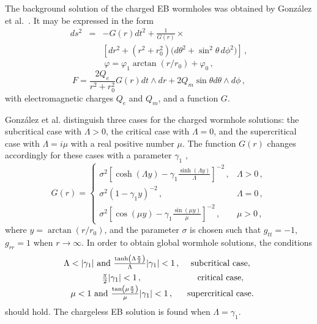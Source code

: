 \documentclass[floats,floatfix,showpacs,amssymb,prd,superscriptaddress,nofootinbib,nolongbibliography,reprint]{revtex4-2}
\begin{document}
The background solution of the charged EB wormholes was obtained by Gonz\'alez et al.~\cite{Gonzalez:2009hn}.
It may be expressed in the form
\begin{eqnarray}
     ds^2 &=&  -G(r) dt^2 
     +{\frac{1}{G(r)}} \times 
     \nonumber \\ &&
    \left[dr^2+(r^2+r_0^2) 
 {   (d\theta^2+ \sin^2{\theta}  \,
    d\phi^2 }
    ) \right] \,,
    \label{eqm}
\end{eqnarray}
\begin{equation}
    \varphi=\varphi_1\arctan{(r/r_0)}+\varphi_0 \, ,
    \label{eqa}
\end{equation}
\begin{equation}
    F=\frac{2Q_e}{r^2+r_0^2}G(r)  dt\wedge dr+2Q_m\sin{\theta}d\theta\wedge d\phi \, ,
    \label{eqp}
\end{equation}
with electromagnetic charges $Q_e$ and $Q_m$, 
and a function $G$.


Gonz\'alez et al.
distinguish three cases for the charged wormhole solutions:
the subcritical case with $\Lambda>0$, the critical case with $\Lambda=0$, and the supercritical case with $\Lambda=i\mu$ with a real positive number $\mu$.
The function $G(r)$ changes accordingly for these cases with a parameter $\gamma_1$
\cite{Gonzalez:2009hn},
\begin{equation}
G(r)
= \left\{
\begin{array}{cc} 
 {\sigma^2} \left[\cosh{(\Lambda y)}-\gamma_1\frac{\sinh{(\Lambda y)}} {\Lambda}\right]^{{-2}}  \, ,
%
& \Lambda > 0 \, ,\\[5pt]
 {\sigma^2} (1-\gamma_1y)^{{-2}} \, ,
%
& \Lambda = 0 \, ,\\[2pt]
{\sigma^2} \left[ \cos(\mu y) - \gamma_1\frac{\sin(\mu y)}{\mu} \right]^{{-2}} \, ,
%
%
& {\mu >0} \, ,
\end{array} 
\right.
\label{cases1}
\end{equation}
where $y=\arctan{(r/r_0)}$, {and the parameter $\sigma$ is chosen {such} that $g_{tt}=-1$, $g_{rr}=1$ when $r {\rightarrow} \infty$}. 
%
%
In order to obtain global wormhole solutions, the conditions 
\begin{equation}
\left.
\begin{array}{cc}
  {\Lambda < |\gamma_1|} \hbox{ and }
  \frac{\tanh\left(\Lambda\frac{\pi}{2}\right)}{\Lambda} |\gamma_1| < 1 \, ,
& \hbox{subcritical case},\\[5pt]
  \frac{\pi}{2}|\gamma_1| < 1 \, ,
& \hbox{critical case},\\[2pt]
  \mu < 1 \hbox{ and }
  \frac{\tan\left(\mu\frac{\pi}{2}\right)}{\mu} |\gamma_1| < 1 \, ,
& \hbox{supercritical case} .
\end{array} 
\right.
\label{cases2}
\end{equation}
should hold.
The chargeless EB solution 
is found when $\Lambda=\gamma_1$.
\end{document}
